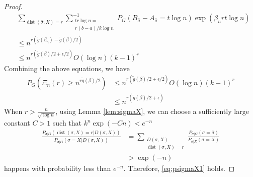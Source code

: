 \documentclass[entropy,article,submit,moreauthors,pdftex]{Definitions/mdpi}
\newcommand{\1}{\mathbbm{1}}
\DeclareMathOperator{\Dist}{dist}
\begin{document}
\begin{proof}
\begin{align*}
&\sum_{\Dist(\bar{\sigma}, X) = r}\sum_{\substack{tr\log n = \\ r(b-a)/k\log n} }^{-1}
P_G(B_{\bar{\sigma}} -A_{\bar{\sigma}}=t\log n)\exp(\beta_n rt \log n) \\
& \leq  n^{r(\tilde{g}(\beta_n) - \tilde{g}(\beta)/2)}\\
& \leq  n^{r(\tilde{g}(\beta)/2 + \epsilon/2)} O(\log n) (k-1)^r
\end{align*}
Combining the above equations, we have
\begin{align*}
P_{G}(\Xi_n(r) \geq n^{r \tilde{g}(\beta) /2}) &\leq  n^{r(\tilde{g}(\beta)/2 + \epsilon/2)} O(\log n) (k-1)^r\\
&\leq n^{r(\tilde{g}(\beta)/2 + \epsilon)}
\end{align*}
When $r>\frac{n}{\sqrt{\log n}}$, using Lemma \ref{lem:sigmaX}, we can choose a sufficiently large constant $C>1$
such that $k^n\exp(-Cn) < e^{-n}$
\begin{align*}
\frac{P_{\sigma|G}(\Dist(\sigma, X)=r | D(\sigma, X))}
{P_{\sigma|G}(\sigma=X | D(\sigma, X))} &= \sum_{\substack{D(\sigma, X) \\ \Dist(\sigma, X)=r}} \frac{P_{\sigma | G}(\sigma = \bar{\sigma}) }{P_{\sigma | X}(\sigma = X)} \\
&> \exp(-n)
\end{align*}
happens with probability less than $e^{-n}$. Therefore, \eqref{eq:psigmaX1} holds.
\end{proof}
\end{document}
